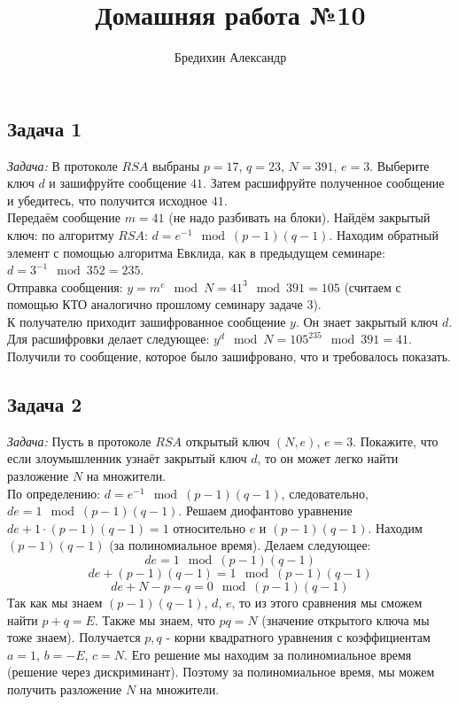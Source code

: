 \documentclass[a4paper,12pt]{article} %
\author{Бредихин Александр}
\title{Домашняя работа №10}
\begin{document}
\maketitle

\subsection*{Задача 1}
\textit{Задача:} В протоколе $RSA$ выбраны $p = 17$, $q = 23$, $N=391$, $e=3$. Выберите ключ $d$ и зашифруйте сообщение $41$. Затем расшифруйте полученное сообщение и убедитесь, что получится исходное $41$. \smallskip \\

Передаём сообщение $ m = 41 $ (не надо разбивать на блоки). Найдём закрытый ключ: по алгоритму $RSA$: $ d = e^{-1} \mod (p-1)(q-1) $. Находим обратный элемент с помощью алгоритма Евклида, как в предыдущем семинаре: $ d = 3^{-1} \mod 352 = 235 $.\\

Отправка сообщения: $y = m^e \mod N = 41^3 \mod 391 = 105$ (считаем с помощью КТО аналогично прошлому семинару задаче 3).\\

К получателю приходит зашифрованное сообщение $ y $. Он знает закрытый ключ $ d $. Для расшифровки делает следующее: $ y^d \mod N = 105^{235} \mod 391 = 41 $. Получили то сообщение, которое было зашифровано, что и требовалось показать.

\subsection*{Задача 2}
\textit{Задача:} Пусть в протоколе $RSA$ открытый ключ $(N, e)$, $e=3$. Покажите, что если злоумышленник узнаёт закрытый ключ $d$, то он может легко найти разложение $N$ на множители. \smallskip \\

По определению: $ d = e^{-1} \mod (p-1)(q-1) $, следовательно, $ de = 1 \mod (p-1)(q-1) $. Решаем диофантово уравнение $ de + 1 \cdot (p-1)(q-1) = 1 $ относительно $ e $ и $ (p-1)(q-1) $. Находим $(p-1)(q-1)$ (за полиномиальное время). Делаем следующее:\\
$$
de = 1 \mod (p-1)(q-1)
$$
$$
de + (p-1)(q-1) = 1 \mod (p-1)(q-1) 
$$
$$
de + N - p - q = 0 \mod (p-1)(q-1)
$$
Так как мы знаем $ (p-1)(q-1) $, $ d$, $ e $, то из этого сравнения мы сможем найти $ p+q = E$. Также мы знаем, что $ pq = N $ (значение открытого ключа мы тоже знаем). Получается $ p,q $ - корни квадратного уравнения с коэффициентам $ a = 1 $, $ b = -E $, $ c = N $. Его решение мы находим за полиномиальное время (решение через дискриминант). Поэтому за полиномиальное время, мы можем получить разложение $ N $ на множители.
\end{document}

